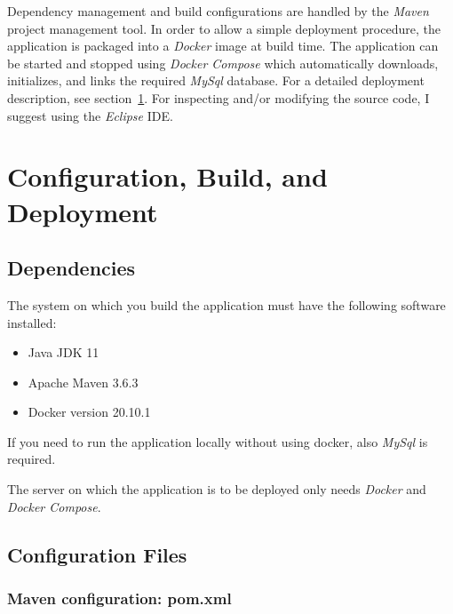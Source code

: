 \documentclass[fleqn]{article}
\begin{document}
Dependency management and build configurations are handled by the \emph{Maven} project management tool.
In order to allow a simple deployment procedure, the application is packaged into a \emph{Docker} image
at build time. The application can be started and stopped using \emph{Docker Compose} which automatically
downloads, initializes, and links the required \emph{MySql} database.
For a detailed deployment description, see section~\ref{sec:deployment}. 
For inspecting and/or modifying the source code, I suggest using the \emph{Eclipse} IDE.

\section{Configuration, Build, and Deployment}
\label{sec:deployment}

\subsection{Dependencies}

The system on which you build the application must have the following software installed:

\begin{itemize}

\item Java JDK 11

\item Apache Maven 3.6.3

\item Docker version 20.10.1

\end{itemize}

If you need to run the application locally without using docker, also \emph{MySql} is required. 

The server on which the application is to be deployed only needs \emph{Docker} and \emph{Docker Compose}.

\subsection{Configuration Files}

\subsubsection{Maven configuration: pom.xml}
\end{document}
